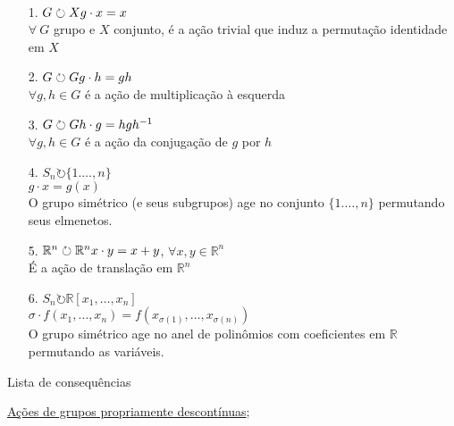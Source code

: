 \begin{ex}
\ 
	\begin{itemize}
    
	    \item[1.] $G\circlearrowright X \\
                g\cdot x = x$\\
                $\forall \  G$ grupo e $X$ conjunto, é a ação trivial que induz a permutação identidade em $X$

        \item[2.] $G\circlearrowright G\\
                g\cdot h = gh$\\
                $\forall g,h \in G$ é a ação de multiplicação à esquerda
        
	  \item[3.]  $G\circlearrowright G\\
                h\cdot g = hgh^{-1}$\\
                $\forall g,h \in G$ é a ação da conjugação de $g$ por $h$

        \item[4.] $S_n \circlearrowright \{1.\dots,n\}$\\
                $g\cdot x = g(x)$\\
                O grupo simétrico (e seus subgrupos) age no conjunto $\{1.\dots,n\}$ permutando seus elmenetos.
        
        \item[5.] $\mathbb{R}^n\circlearrowright \mathbb{R}^n\\
                x\cdot y = x+y$, $\forall x,y\in \mathbb{R}^n$\\
                É a ação de translação em $\mathbb{R}^n$

        \item[6.] $S_n \circlearrowright \mathbb{R}[x_1,\dots,x_n]$\\
                $\sigma\cdot f(x_1,\dots,x_n) = f(x_{\sigma(1)},\dots,x_{\sigma(n)})$\\
                O grupo simétrico age no anel de polinômios com coeficientes em $\mathbb{R}$ permutando as variáveis.


    \end{itemize}
\end{ex}
 

\begin{titlemize}{Lista de consequências}
	\item \hyperref[ações-de-grupo-propriamente-descontínuas-def]{Ações de grupos propriamente descontínuas};
\end{titlemize}
